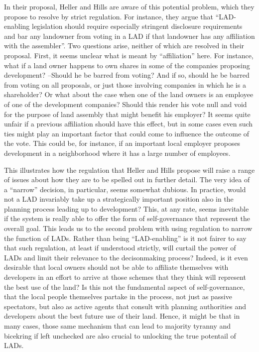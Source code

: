  In their proposal, Heller and Hills are aware of this potential problem, which they propose to resolve by strict regulation. For instance, they argue that ``LAD-enabling legislation should require especially stringent disclosure requirements and bar any landowner from voting in a LAD if that landowner has any affiliation with the assembler''. Two questions arise, neither of which are resolved in their proposal. First, it seems unclear what is meant by ``affiliation'' here. For instance, what if a land owner happens to own shares in some of the companies proposing development? --Should he be barred from voting? And if so, should he be barred from voting on all proposals, or just those involving companies in which he is a shareholder?  Or what about the case when one of the land owners is an employee of one of the development companies? Should this render his vote null and void for the purpose of land assembly that might benefit his employer? It seems quite unfair if a previous affiliation should have this effect, but in some cases even such ties might play an important factor that could come to influence the outcome of the vote. This could be, for instance, if an important local employer proposes development in a neighborhood where it has a large number of employees. 

This illustrates how the regulation that Heller and Hills propose will raise a range of issues about how they are to be spelled out in further detail. The very idea of a ``narrow'' decision, in particular, seems somewhat dubious. In practice, would not a LAD invariably take up a strategically important position also in the planning process leading up to development? This, at any rate, seems inevitable if the system is really able to offer the form of self-governance that represent the overall goal. This leads us to the second problem with using regulation to narrow the function of LADs. Rather than being ``LAD-enabling'' is it not fairer to say that such regulation, at least if understood strictly, will curtail the power of LADs and limit their relevance to the decisonmaking process? Indeed, is it even desirable that local owners should not be able to affiliate themselves with developers in an effort to arrive at those schemes that they think will represent the best use of the land? Is this not the fundamental aspect of self-governance, that the local people themselves partake in the process, not just as passive spectators, but also as active agents that consult with planning authorities and developers about the best future use of their land. Hence, it might be that in many cases, those same mechanism that can lead to majority tyranny and bicekring if left unchecked are also crucial to unlocking the true potentail of LADs.

